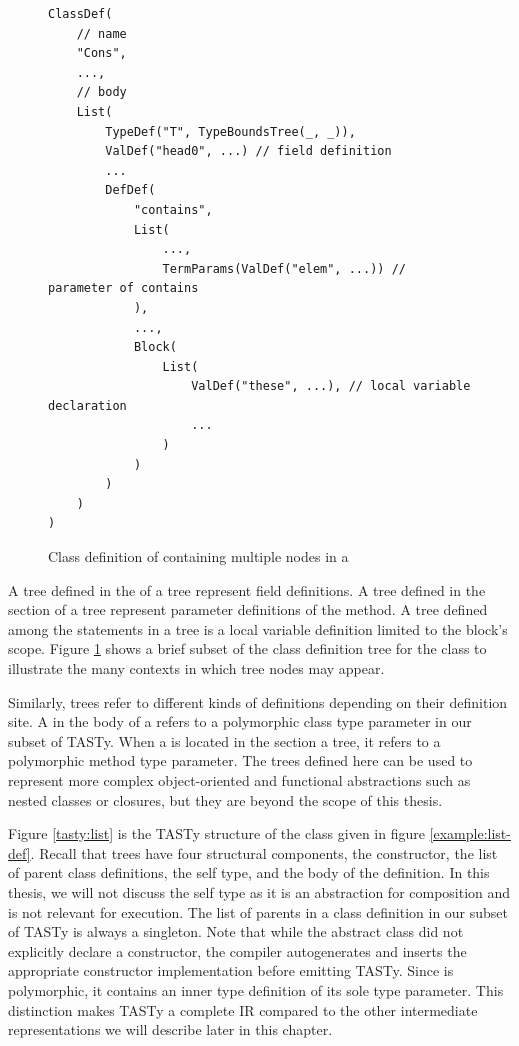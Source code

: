 \begin{figure}[!htb]
\begin{verbatim}
ClassDef(
	// name 
	"Cons",
	...,
	// body
	List(
		TypeDef("T", TypeBoundsTree(_, _)),
		ValDef("head0", ...) // field definition
		...
		DefDef(
			"contains",
			List(
				...,
				TermParams(ValDef("elem", ...)) // parameter of contains
			),
			...,
			Block(
				List(
					ValDef("these", ...), // local variable declaration		
					...
				)
			)
		)
	)
)
\end{verbatim} 
\caption{Class definition of  containing multiple  nodes in a }
\label{example:many-valdefs}
\end{figure}

A  tree defined in the  of a  tree represent field definitions.
A  tree defined in the  section of a  tree represent parameter definitions of the method.
A  tree defined among the statements in a  tree is a local variable definition limited to the block's scope.
Figure \ref{example:many-valdefs} shows a brief subset of the class definition tree for the  class to illustrate the many contexts in which  tree nodes may appear.

Similarly,  trees refer to different kinds of definitions depending on their definition site.
A  in the body of a  refers to a polymorphic class type parameter in our subset of TASTy.
When a  is located in the  section a  tree, it refers to a polymorphic method type parameter.
The trees defined here can be used to represent more complex object-oriented and functional abstractions such as nested classes or closures, but they are beyond the scope of this thesis.

Figure \ref{tasty:list} is the TASTy structure of the  class given in figure \ref{example:list-def}. 
Recall that  trees have four structural components, the constructor, the list of parent class definitions, the self type, and the body of the definition.
In this thesis, we will not discuss the self type as it is an abstraction for composition\cite{gilad:mixins,scala:calculus} and is not relevant for execution.
The list of parents in a class definition in our subset of TASTy is always a singleton.
Note that while the abstract  class did not explicitly declare a constructor, the compiler autogenerates and inserts the appropriate constructor implementation before emitting TASTy.
Since  is polymorphic, it contains an inner type definition of its sole type parameter.
This distinction makes TASTy a complete IR compared to the other intermediate representations we will describe later in this chapter.

